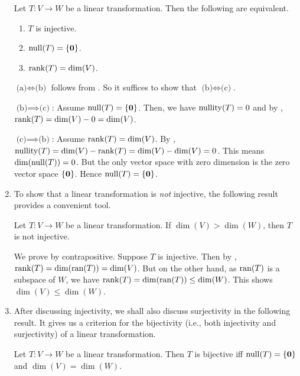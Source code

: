 \begin{enumerate}
\begin{theorem}
\label{thm:lin-tran-inj-crit}
Let \(T:V\to W\) be a linear transformation. Then the following are equivalent.
\begin{enumerate}
\item \(T\) is injective.
\item \(\operatorname{null}(T)=\{\vb*{0}\}\).
\item \(\operatorname{rank}(T)=\dim(V)\).
\end{enumerate}
\end{theorem}
\begin{pf}
\(\text{(a)}\iff \text{(b)}\) follows from
. So it suffices to show that
\(\text{(b)}\iff\text{(c)}\).

\underline{\(\text{(b)}\implies \text{(c)}\)}: Assume \(\operatorname{null}(T)=\{\vb*{0}\}\).
Then, we have \(\operatorname{nullity}(T)=0\) and by ,
\(\operatorname{rank}(T)=\dim(V)-0=\dim(V)\).

\underline{\(\text{(c)}\implies \text{(b)}\)}: Assume \(\operatorname{rank}(T)=\dim(V)\). By
, \(\operatorname{nullity}(T)=\dim(V)-\operatorname{rank}(T)=\dim(V)-\dim(V)=0\). This means
\(\dim(\operatorname{null}(T))=0\). But the only vector space with zero dimension is the zero
vector space \(\{\vb*{0}\}\). Hence \(\operatorname{null}(T)=\{\vb*{0}\}\).
\end{pf}
\item To show that a linear transformation is \emph{not} injective, the
following result provides a convenient tool.

\begin{proposition}
\label{prp:suff-not-inj}
Let \(T:V\to W\) be a linear transformation. If \(\dim(V)>\dim(W)\), then \(T\)
is not injective.
\end{proposition}
\begin{pf}
We prove by contrapositive. Suppose \(T\) is injective. Then by
, \(\operatorname{rank}(T)=\dim(\operatorname{ran}(T))=\dim(V)\). But on the
other hand, as \(\operatorname{ran}(T)\) is a subspace of \(W\), we have
\(\operatorname{rank}(T)=\dim(\operatorname{ran}(T))\le\dim(W)\). This shows \(\dim(V)\le\dim(W)\).
\end{pf}

\item After discussing injectivity, we shall also discuss surjectivity in the
following result. It gives us a criterion for the bijectivity (i.e., both
injectivity and surjectivity) of a linear transformation.

\begin{theorem}
\label{thm:lin-tran-bij-crit}
Let \(T:V\to W\) be a linear transformation. Then \(T\) is bijective iff
\(\operatorname{null}(T)=\{\vb*{0}\}\) and \(\dim(V)=\dim(W)\).
\end{theorem}


\end{enumerate}
